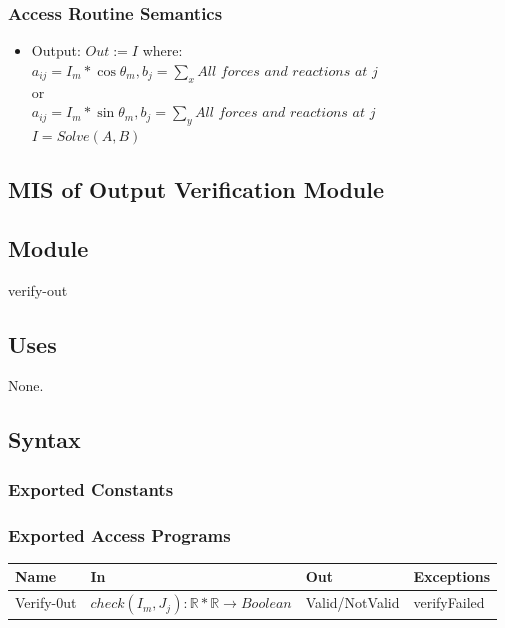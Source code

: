 \documentclass[12pt, titlepage]{article}
\begin{document}
\subsubsection{Access Routine Semantics}
\begin{itemize}
    \item Output: $Out:=I$ where:\\
    
    $a_{ij}=I_m*\cos\theta_{m},b_j=\sum_x \textit{All forces and reactions at j}$\\
or\\
$a_{ij}=I_m*\sin\theta_{m},b_j=\sum_y \textit{All forces and reactions at j}$\\

$I=Solve(A,B)$\\
\end{itemize}
\subsection{MIS of Output Verification Module \label{mSpec} }

\subsection{Module}

verify-out

\subsection{Uses}
None.

\subsection{Syntax}

\subsubsection{Exported Constants}
\subsubsection{Exported Access Programs}
\begin{center}
\begin{tabular}{p{2cm} p{4cm} p{4cm} p{2cm}}
\hline
\textbf{Name} & \textbf{In} & \textbf{Out} & \textbf{Exceptions} \\
\hline

Verify-0ut & $check(I_m,J_j):\mathbb{R}*\mathbb{R} \rightarrow {Boolean}$  & Valid/NotValid & verifyFailed \\
\hline
\end{tabular}
\end{center}
\end{document}
